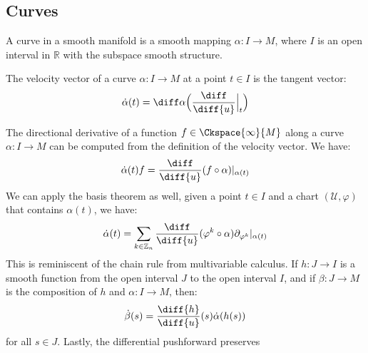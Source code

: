 \documentclass{article}                                                        %
\begin{document}
        \subsection{Curves}
            \begin{definition}
                A curve in a smooth manifold is a smooth mapping
                $\alpha:I\rightarrow{M}$, where $I$ is an open interval in
                $\mathbb{R}$ with the subspace smooth structure.
            \end{definition}
            \begin{definition}
                The velocity vector of a curve $\alpha:I\rightarrow{M}$ at a
                point $t\in{I}$ is the tangent vector:
                \begin{equation}
                    \dot{\alpha}(t)=\diff\alpha\Big(
                        \frac{\diff}{\diff{u}}\Big|_{t}
                    \Big)
                \end{equation}
            \end{definition}
            The directional derivative of a function $f\in\Ckspace{\infty}{M}$
            along a curve $\alpha:I\rightarrow{M}$ can be computed from the
            definition of the velocity vector. We have:
            \begin{equation}
                \dot{\alpha}(t)f
                =\frac{\diff}{\diff{u}}(f\circ\alpha)|_{\alpha(t)}
            \end{equation}
            We can apply the basis theorem as well, given a point $t\in{I}$ and
            a chart $(\mathcal{U},\varphi)$ that contains $\alpha(t)$, we have:
            \begin{equation}
                \dot{\alpha}(t)=\sum_{k\in\mathbb{Z}_{n}}
                    \frac{\diff}{\diff{u}}(\varphi^{k}\circ\alpha)
                    \partial_{\varphi^{k}}|_{\alpha(t)}
            \end{equation}
            This is reminiscent of the chain rule from multivariable calculus.
            If $h:J\rightarrow{I}$ is a smooth function from the open interval
            $J$ to the open interval $I$, and if $\beta:J\rightarrow{M}$ is the
            composition of $h$ and $\alpha:I\rightarrow{M}$, then:
            \begin{equation}
                \dot{\beta}(s)=\frac{\diff{h}}{\diff{u}}(s)\dot{\alpha}(h(s))
            \end{equation}
            for all $s\in{J}$. Lastly, the differential pushforward preserves
\end{document}
